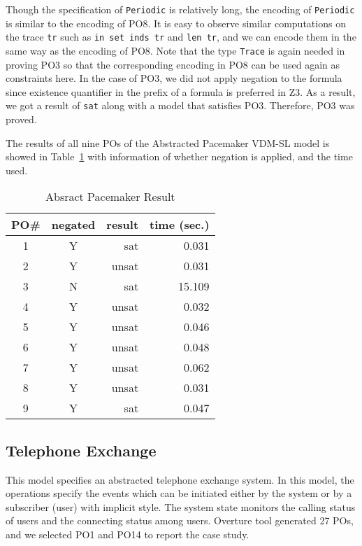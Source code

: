 Though the specification of {\tt Periodic} is relatively long, the encoding of {\tt Periodic} is similar to the encoding of PO8. It is easy to observe similar computations on the trace {\tt tr} such as {\tt in set inds tr} and {\tt len tr}, and we can encode them in the same way as the encoding of PO8. Note that the type {\tt Trace} is again needed in proving PO3 so that the corresponding encoding in PO8 can be used again as constraints here. In the case of PO3, we did not apply negation to the formula since existence quantifier in the prefix of a formula is preferred in Z3. As a result, we got a result of {\tt sat} along with a model that satisfies PO3. Therefore, PO3 was proved.

The results of all nine POs of the Abstracted Pacemaker VDM-SL model is showed in Table~\ref{tbl:result1} with information of whether negation is applied, and the time used.

\begin{table}[htb]
\begin{center}
\begin{tabular}{|c|c|r|r|}
\hline
PO\#	&	negated	&	result	&	time (sec.) \\ \hline
1		&	Y		&	sat		&	0.031 \\ \hline
2		&	Y		&	unsat	&	0.031 \\ \hline
3		&	N		&	sat		&	15.109 \\ \hline
4		&	Y		&	unsat	&	0.032 \\ \hline
5		&	Y		&	unsat	&	0.046 \\ \hline
6		&	Y		&	unsat	&	0.048 \\ \hline
7		&	Y		&	unsat	&	0.062 \\ \hline
8		&	Y		&	unsat	&	0.031 \\ \hline
9		&	Y		&	sat		&	0.047 \\ \hline
\end{tabular}
\end{center}
\caption{Absract Pacemaker Result}
\label{tbl:result1}
\vspace{-20pt}
\end{table}


\subsection{Telephone Exchange}
\label{section:case2}

This model specifies an abstracted telephone exchange system. In this model, the operations specify the events which can be initiated either by the system or by a subscriber (user) with implicit style. The system state monitors the calling status of users and the connecting status among users. Overture tool generated 27 POs, and we selected PO1 and PO14 to report the case study.

